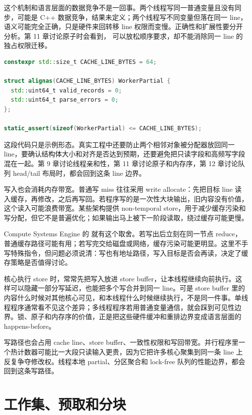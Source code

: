 这个机制和语言层面的数据竞争不是一回事。两个线程写同一普通变量且没有同步，可能是 C++ 数据竞争，结果未定义；两个线程写不同变量但落在同一 line，语义可能完全正确，只是硬件来回转移 line 权限而变慢。正确性和扩展性要分开分析。第 11 章讨论原子时会看到， 可以放松顺序要求，却不能消除同一 line 的独占权限迁移。

\begin{lstlisting}[language=C++,caption={按 cache line 隔离高频写 partial}]
constexpr std::size_t CACHE_LINE_BYTES = 64;

struct alignas(CACHE_LINE_BYTES) WorkerPartial {
  std::uint64_t valid_records = 0;
  std::uint64_t parse_errors = 0;
};

static_assert(sizeof(WorkerPartial) <= CACHE_LINE_BYTES);
\end{lstlisting}

这段代码只是示例形态。真实工程中还要防止两个相邻对象被分配器放回同一 line，要确认结构体大小和对齐是否达到预期，还要避免把只读字段和高频写字段混在一起。第 9 章讨论线程亲和性，第 11 章讨论原子和内存序，第 12 章讨论队列 head/tail 布局时，都会回到这条 line 边界。

写入也会消耗内存带宽。普通写 miss 往往采用 write allocate：先把目标 line 读入缓存，再修改，之后再写回。若程序写的是一次性大块输出，旧内容没有价值，这个读入可能浪费带宽。某些架构提供 non-temporal store，用于减少缓存污染和写分配，但它不是普遍优化；如果输出马上被下一阶段读取，绕过缓存可能更慢。

Compute Systems Engine 的  就有这个取舍。若写出后立刻在同一节点 reduce，普通缓存路径可能有用；若写完交给磁盘或网络，缓存污染可能更明显。这里不手写特殊指令，但问题必须说清：写也有地址路径，写入目标是否会再读，决定了缓存策略是否值得讨论。

核心执行 store 时，常常先把写入放进 store buffer，让本线程继续向前执行。这样可以隐藏一部分写延迟，也能把多个写合并到同一 line。可是 store buffer 里的内容什么时候对其他核心可见，和本线程什么时候继续执行，不是同一件事。单线程程序通常看不见这个差异；多线程程序若用普通变量通信，就会踩到可见性边界。锁、原子和内存序的价值，正是把这些硬件缓冲和重排边界变成语言层面的 happens-before。

写路径也会占用 cache line、store buffer、一致性权限和写回带宽。并行程序里一个热计数器可能比一大段只读输入更贵，因为它把许多核心聚集到同一条 line 上反复争夺修改权。线程本地 partial、分区聚合和 lock-free 队列的性能边界，都会回到这条写路径。

\section{工作集、预取和分块}

